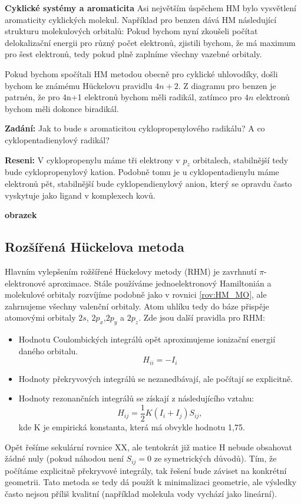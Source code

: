 \textbf{Cyklické systémy a aromaticita}
Asi největším úspěchem HM bylo vysvětlení aromaticity cyklických molekul.
Například pro benzen dává HM následující strukturu molekulových orbitalů:
Pokud bychom nyní zkoušeli počítat delokalizační energii pro různý počet elektronů, zjistili bychom, že má maximum pro šest elektronů, tedy pokud plně zaplníme všechny vazebné orbitaly.

Pokud bychom spočítali HM metodou obecně pro cyklické uhlovodíky, došli bychom ke známému H\"{u}ckelovu pravidlu $4n+2$. Z diagramu pro benzen je patrnén, že pro 4n+1 elektronů bychom měli radikál, zatímco pro $4n$ elektronů bychom měli dokonce biradikál.

\begin{priklad}
\textbf{Zadání:} Jak to bude s aromaticitou cyklopropenylového radikálu? A co cyklopentadienylový radikál?

\textbf{Reseni:} V cyklopropenylu máme tři elektrony v $p_z$ orbitalech, stabilnější tedy bude cyklopropenylový kation. Podobně tomu je u cyklopentadienylu máme elektronů pět, stabilnější bude cyklopendienylový anion, který se opravdu často vyskytuje jako ligand v komplexech kovů.
\end{priklad}

\textbf{obrazek}
\bigskip

\subsection{Rozšířená H\"{u}ckelova metoda}

Hlavním vylepšením rožšířené H\"{u}ckelovy metody (RHM) je zavrhnutí $\pi$-elektronové aproximace.
Stále používáme jednoelektronový Hamiltonián a molekulové orbitaly rozvíjíme podobně jako v rovnici \ref{rov:HM_MO}, ale zahrnujeme všechny valenční orbitaly. Atom uhlíku tedy do báze přispěje atomovými orbitaly $2s$, $2p_x$,$2p_y$ a $2p_z$. 
Zde jsou další pravidla pro RHM:

\begin{itemize}
\item Hodnotu Coulombických integrálů opět aproximujeme ionizační energií daného orbitalu.
$$H_{ii}=-I_i$$
\item Hodnoty překryvových integrálů se nezanedbávají, ale počítají se explicitně.
\item Hodnoty rezonančních integrálů se získají z následujícího vztahu:
\begin{equation}
H_{ij}=\frac{1}{2}K(I_i+I_j)S_{ij},
\end{equation}
kde K je empirická konstanta, která má obvykle hodnotu 1,75.
\end{itemize}
Opět řešíme sekulární rovnice XX, ale tentokrát již matice H nebude obsahovat žádné nuly (pokud náhodou není $S_{ij}=0$ ze symetrických důvodů). Tím, že počítáme explicitně překryvové integrály, tak řešení bude záviset na konkrétní geometrii. Tato metoda se tedy dá použít k minimalizaci geometrie, ale výsledky často nejsou příliš kvalitní (například molekula vody vychází jako lineární).  

